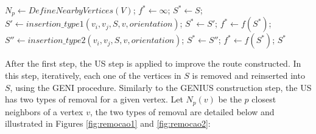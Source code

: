 \documentclass{ro}
\begin{document}
\begin{algorithm}[ht]
	\caption{\hspace{-1mm}:GENI($S, v$)}
	\label{alg:geni}
	\begin{algorithmic}[1]			
		\STATE $N_p \gets DefineNearbyVertices(V)$;
		\STATE	$f^* \gets \infty$; $S^* \gets S$;
		\STATE $S' \gets insertion\_type1(v_i,v_j,S,v,orientation)$;
		\STATE $S^* \gets S'$;
		\STATE $f^* \gets f(S^*)$;
		\ENDIF
		\STATE $S'' \gets insertion\_type2(v_i,v_j,S,v,orientation)$;
		\STATE $S^* \gets S''$;
		\STATE $f^* \gets f(S^*)$;
		\ENDIF
		\ENDFOR
		\ENDFOR
		\RETURN $S^*$
	\end{algorithmic}
	
\end{algorithm}

After the first step, the US step is applied to improve the  route constructed. In this step, iteratively, each one of the vertices in $S$ is removed and reinserted into $S$, using the GENI procedure. Similarly to the GENIUS construction step, the US  has two types of removal for a given vertex. Let $N_p(v)$ be the $p$ closest neighbors  of a vertex $v$, the two types of removal are detailed below and illustrated in Figures \ref{fig:remocao1} and \ref{fig:remocao2}:
\end{document}
